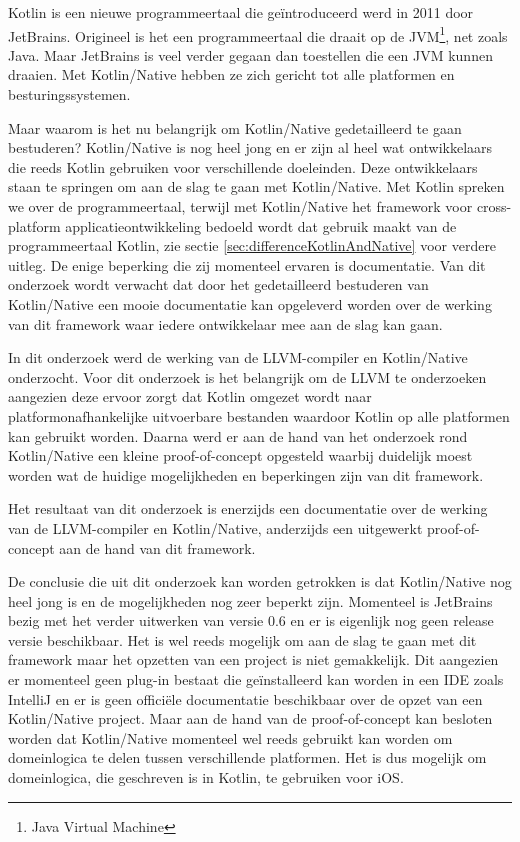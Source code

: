 Kotlin is een nieuwe programmeertaal die geïntroduceerd werd in 2011 door JetBrains. Origineel is het een programmeertaal die draait op de JVM\footnote{Java Virtual Machine}, net zoals Java. Maar JetBrains is veel verder gegaan dan toestellen die een JVM kunnen draaien. Met Kotlin/Native hebben ze zich gericht tot alle platformen en besturingssystemen. 


Maar waarom is het nu belangrijk om Kotlin/Native gedetailleerd te gaan bestuderen? Kotlin/Native is nog heel jong en er zijn al heel wat ontwikkelaars die reeds Kotlin gebruiken voor verschillende doeleinden. Deze ontwikkelaars staan te springen om aan de slag te gaan met Kotlin/Native. Met Kotlin spreken we over de programmeertaal, terwijl met Kotlin/Native het framework voor cross-platform applicatieontwikkeling bedoeld wordt dat gebruik maakt van de programmeertaal Kotlin, zie sectie \ref{sec:differenceKotlinAndNative} voor verdere uitleg. De enige beperking die zij momenteel ervaren is documentatie. Van dit onderzoek wordt verwacht dat door het gedetailleerd bestuderen van Kotlin/Native een mooie documentatie kan opgeleverd worden over de werking van dit framework waar iedere ontwikkelaar mee aan de slag kan gaan.

In dit onderzoek werd de werking van de LLVM-compiler en Kotlin/Native onderzocht. Voor dit onderzoek is het belangrijk om de LLVM te onderzoeken aangezien deze ervoor zorgt dat Kotlin omgezet wordt naar platformonafhankelijke uitvoerbare bestanden waardoor Kotlin op alle platformen kan gebruikt worden. Daarna werd er aan de hand van het onderzoek rond Kotlin/Native een kleine proof-of-concept opgesteld waarbij duidelijk moest worden wat de huidige mogelijkheden en beperkingen zijn van dit framework.

Het resultaat van dit onderzoek is enerzijds een documentatie over de werking van de LLVM-compiler en Kotlin/Native, anderzijds een uitgewerkt proof-of-concept aan de hand van dit framework.

De conclusie die uit dit onderzoek kan worden getrokken is dat Kotlin/Native nog heel jong is en de mogelijkheden nog zeer beperkt zijn. Momenteel is JetBrains bezig met het verder uitwerken van versie 0.6 en er is eigenlijk nog geen release versie beschikbaar. Het is wel reeds mogelijk om aan de slag te gaan met dit framework maar het opzetten van een project is niet gemakkelijk. Dit aangezien er momenteel geen plug-in bestaat die geïnstalleerd kan worden in een IDE zoals IntelliJ en er is geen officiële documentatie beschikbaar over de opzet van een Kotlin/Native project. Maar aan de hand van de proof-of-concept kan besloten worden dat Kotlin/Native momenteel wel reeds gebruikt kan worden om domeinlogica te delen tussen verschillende platformen. Het is dus mogelijk om domeinlogica, die geschreven is in Kotlin, te gebruiken voor iOS.

